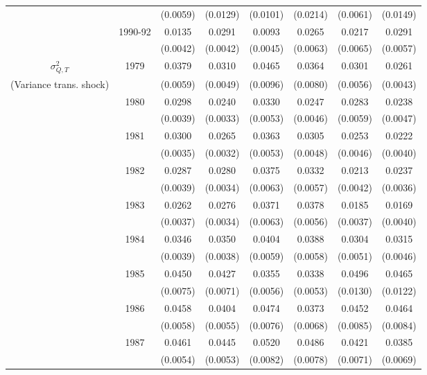 \begin{table}[htbp]
\begin{center}
{\begin{tabular}{cccc|cc|cc}
\\  &                    & (0.0059) & (0.0129)  & (0.0101) & (0.0214)  & (0.0061) & (0.0149) 
\\  & 1990-92 & 0.0135 &   0.0291 & 0.0093 &   0.0265 & 0.0217 &   0.0291 
\\  &         & (0.0042) & (0.0042) & (0.0045) & (0.0063) & (0.0065) & (0.0057) 
\\ \hline  
 $\sigma^2_{Q,T}$ & 1979      & 0.0379 &   0.0310 & 0.0465 &   0.0364 & 0.0301 &   0.0261 
\\ (Variance trans. shock) &     & (0.0059) & (0.0049) & (0.0096) & (0.0080) & (0.0056) & (0.0043) 
\\  & 1980 & 0.0298 &   0.0240 & 0.0330 &   0.0247 & 0.0283 &   0.0238
\\  &                    & (0.0039) & (0.0033)  & (0.0053) & (0.0046)  & (0.0059) & (0.0047) 
\\  & 1981 & 0.0300 &   0.0265 & 0.0363 &   0.0305 & 0.0253 &   0.0222
\\  &                    & (0.0035) & (0.0032)  & (0.0053) & (0.0048)  & (0.0046) & (0.0040) 
\\  & 1982 & 0.0287 &   0.0280 & 0.0375 &   0.0332 & 0.0213 &   0.0237
\\  &                    & (0.0039) & (0.0034)  & (0.0063) & (0.0057)  & (0.0042) & (0.0036) 
\\  & 1983 & 0.0262 &   0.0276 & 0.0371 &   0.0378 & 0.0185 &   0.0169
\\  &                    & (0.0037) & (0.0034)  & (0.0063) & (0.0056)  & (0.0037) & (0.0040) 
\\  & 1984 & 0.0346 &   0.0350 & 0.0404 &   0.0388 & 0.0304 &   0.0315
\\  &                    & (0.0039) & (0.0038)  & (0.0059) & (0.0058)  & (0.0051) & (0.0046) 
\\  & 1985 & 0.0450 &   0.0427 & 0.0355 &   0.0338 & 0.0496 &   0.0465
\\  &                    & (0.0075) & (0.0071)  & (0.0056) & (0.0053)  & (0.0130) & (0.0122) 
\\  & 1986 & 0.0458 &   0.0404 & 0.0474 &   0.0373 & 0.0452 &   0.0464
\\  &                    & (0.0058) & (0.0055)  & (0.0076) & (0.0068)  & (0.0085) & (0.0084) 
\\  & 1987 & 0.0461 &   0.0445 & 0.0520 &   0.0486 & 0.0421 &   0.0385
\\  &                    & (0.0054) & (0.0053)  & (0.0082) & (0.0078)  & (0.0071) & (0.0069) 

\end{tabular}}
\end{center}
\end{table}
